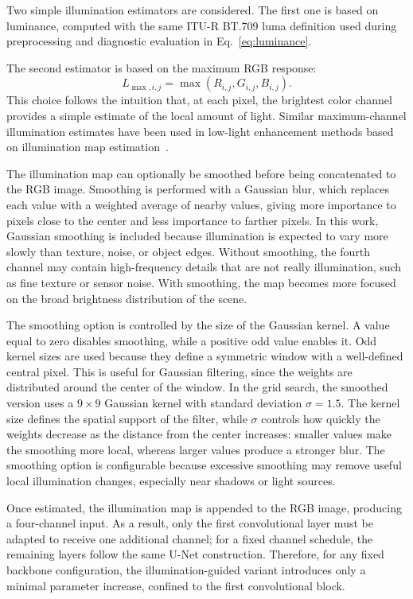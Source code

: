 Two simple illumination estimators are considered. The first one is based on luminance, computed with the same ITU-R BT.709 luma definition used during preprocessing and diagnostic evaluation in Eq.~\ref{eq:luminance}.

The second estimator is based on the maximum RGB response:
\begin{equation}
	L_{\max,i,j}
	=
	\max\left(R_{i,j}, G_{i,j}, B_{i,j}\right).
	\label{eq:max_rgb_res}
\end{equation}
This choice follows the intuition that, at each pixel, the brightest color channel provides a simple estimate of the local amount of light. Similar maximum-channel illumination estimates have been used in low-light enhancement methods based on illumination map estimation~\cite{DBLP:journals/tip/GuoLL17}.

The illumination map can optionally be smoothed before being concatenated to the RGB image. Smoothing is performed with a Gaussian blur, which replaces each value with a weighted average of nearby values, giving more importance to pixels close to the center and less importance to farther pixels. In this work, Gaussian smoothing is included because illumination is expected to vary more slowly than texture, noise, or object edges. Without smoothing, the fourth channel may contain high-frequency details that are not really illumination, such as fine texture or sensor noise. With smoothing, the map becomes more focused on the broad brightness distribution of the scene.

The smoothing option is controlled by the size of the Gaussian kernel. A value equal to zero disables smoothing, while a positive odd value enables it. Odd kernel sizes are used because they define a symmetric window with a well-defined central pixel. This is useful for Gaussian filtering, since the weights are distributed around the center of the window. In the grid search, the smoothed version uses a $9 \times 9$ Gaussian kernel with standard deviation $\sigma = 1.5$. The kernel size defines the spatial support of the filter, while $\sigma$ controls how quickly the weights decrease as the distance from the center increases: smaller values make the smoothing more local, whereas larger values produce a stronger blur. The smoothing option is configurable because excessive smoothing may remove useful local illumination changes, especially near shadows or light sources.

Once estimated, the illumination map is appended to the RGB image, producing a four-channel input. As a result, only the first convolutional layer must be adapted to receive one additional channel; for a fixed channel schedule, the remaining layers follow the same U-Net construction. Therefore, for any fixed backbone configuration, the illumination-guided variant introduces only a minimal parameter increase, confined to the first convolutional block.

